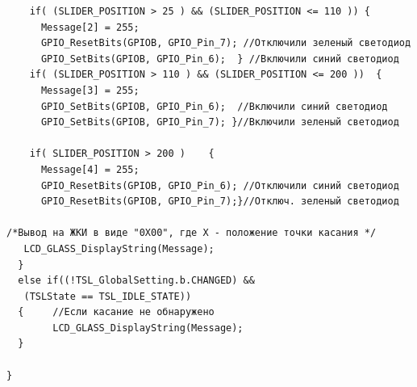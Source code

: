 \begin{verbatim}
    if( (SLIDER_POSITION > 25 ) && (SLIDER_POSITION <= 110 )) {       
      Message[2] = 255; 
      GPIO_ResetBits(GPIOB, GPIO_Pin_7); //Отключили зеленый светодиод
      GPIO_SetBits(GPIOB, GPIO_Pin_6);  } //Включили синий светодиод
    if( (SLIDER_POSITION > 110 ) && (SLIDER_POSITION <= 200 ))  {      
      Message[3] = 255;  
      GPIO_SetBits(GPIOB, GPIO_Pin_6);  //Включили синий светодиод
      GPIO_SetBits(GPIOB, GPIO_Pin_7); }//Включили зеленый светодиод
      
    if( SLIDER_POSITION > 200 )    {    
      Message[4] = 255;
      GPIO_ResetBits(GPIOB, GPIO_Pin_6); //Отключили синий светодиод
      GPIO_ResetBits(GPIOB, GPIO_Pin_7);}//Отключ. зеленый светодиод
      
/*Вывод на ЖКИ в виде "0Х00", где Х - положение точки касания */   
   LCD_GLASS_DisplayString(Message);
  } 
  else if((!TSL_GlobalSetting.b.CHANGED) &&
   (TSLState == TSL_IDLE_STATE))
  {     //Если касание не обнаружено
        LCD_GLASS_DisplayString(Message);
  }
   
}
\end{verbatim}


